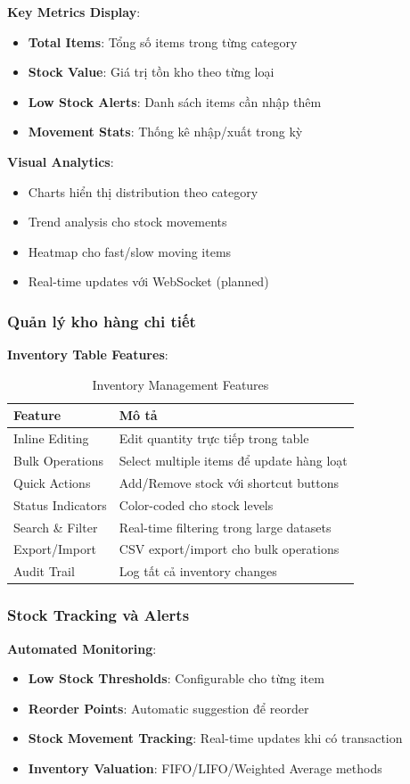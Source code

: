 \documentclass[12pt,a4paper]{article}
\begin{document}
\textbf{Key Metrics Display}:
\begin{itemize}
    \item \textbf{Total Items}: Tổng số items trong từng category
    \item \textbf{Stock Value}: Giá trị tồn kho theo từng loại
    \item \textbf{Low Stock Alerts}: Danh sách items cần nhập thêm
    \item \textbf{Movement Stats}: Thống kê nhập/xuất trong kỳ
\end{itemize}

\textbf{Visual Analytics}:
\begin{itemize}
    \item Charts hiển thị distribution theo category
    \item Trend analysis cho stock movements
    \item Heatmap cho fast/slow moving items
    \item Real-time updates với WebSocket (planned)
\end{itemize}

\subsubsection{Quản lý kho hàng chi tiết}
\textbf{Inventory Table Features}:
\begin{table}[H]
\centering
\begin{tabular}{@{}ll@{}}
\toprule
\textbf{Feature} & \textbf{Mô tả} \\
\midrule
Inline Editing & Edit quantity trực tiếp trong table \\
Bulk Operations & Select multiple items để update hàng loạt \\
Quick Actions & Add/Remove stock với shortcut buttons \\
Status Indicators & Color-coded cho stock levels \\
Search \& Filter & Real-time filtering trong large datasets \\
Export/Import & CSV export/import cho bulk operations \\
Audit Trail & Log tất cả inventory changes \\
\bottomrule
\end{tabular}
\caption{Inventory Management Features}
\end{table}

\subsubsection{Stock Tracking và Alerts}
\textbf{Automated Monitoring}:
\begin{itemize}
    \item \textbf{Low Stock Thresholds}: Configurable cho từng item
    \item \textbf{Reorder Points}: Automatic suggestion để reorder
    \item \textbf{Stock Movement Tracking}: Real-time updates khi có transaction
    \item \textbf{Inventory Valuation}: FIFO/LIFO/Weighted Average methods
\end{itemize}
\end{document}
